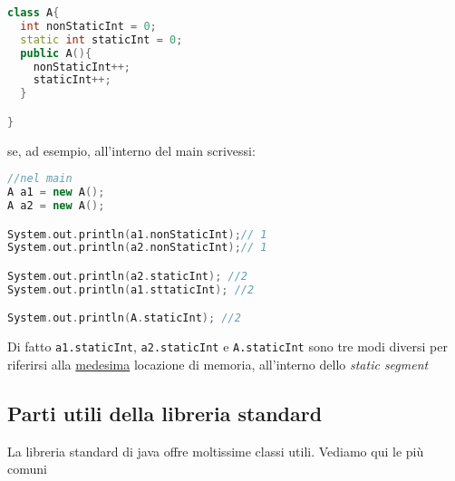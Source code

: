 \vskip3mm
\begin{lstlisting}[language = c++, frame = none]
class A{
  int nonStaticInt = 0;
  static int staticInt = 0;
  public A(){
    nonStaticInt++;
    staticInt++;
  }

}
\end{lstlisting}
\vskip3mm
se, ad esempio, all'interno del main scrivessi:
\vskip3mm
\begin{lstlisting}[language = c++, frame = none]
//nel main 
A a1 = new A();
A a2 = new A();

System.out.println(a1.nonStaticInt);// 1
System.out.println(a2.nonStaticInt);// 1

System.out.println(a2.staticInt); //2
System.out.println(a1.sttaticInt); //2

System.out.println(A.staticInt); //2
\end{lstlisting}
\vskip3mm
Di fatto \verb|a1.staticInt|, \verb|a2.staticInt| e \verb|A.staticInt| sono tre modi diversi per riferirsi alla \underline{medesima} locazione di memoria, all'interno dello \textit{static segment}
\subsection{Parti utili della libreria standard}
La libreria standard di java offre moltissime classi utili. Vediamo qui le più comuni
